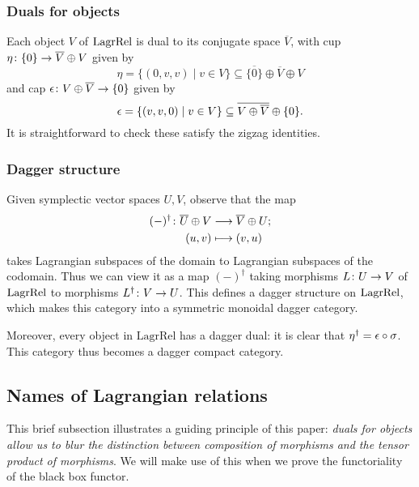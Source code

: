 \subsubsection*{Duals for objects}

Each object $V$ of $\mathrm{LagrRel}$ is dual to its conjugate space $\overline
V$, with cup $\eta{\colon} \{0\} \to \overline{V} \oplus V$ given by 
\[
  \eta = \{(0,v,v) \mid v \in V\} \subseteq \overline{\{0\}} \oplus \overline{V}
  \oplus V
\]
and cap $\epsilon{\colon} V \oplus \overline{V} \to \{0\}$ given by
\[
  \epsilon = \{(v,v,0) \mid v \in V\} \subseteq \overline{V \oplus \overline{V}}
  \oplus \{0\}.
\]
It is straightforward to check these satisfy the zigzag identities.

\subsubsection*{Dagger structure}

Given symplectic vector spaces $U,V$, observe that the map
\begin{align*}
  (-)^\dagger{\colon} \overline{U} \oplus V &\longrightarrow \overline{V} \oplus U; \\
  (u,v) &\longmapsto (v,u)
\end{align*} 
takes Lagrangian subspaces of the domain to Lagrangian subspaces of the
codomain. Thus we can view it as a map $(-)^\dagger$ taking morphisms $L{\colon} U \to V$
of $\mathrm{LagrRel}$ to morphisms $L^\dagger{\colon} V \to U$. This defines a
dagger structure on $\mathrm{LagrRel}$, which makes this category into a
symmetric monoidal dagger category.

Moreover, every object in $\mathrm{LagrRel}$ has a dagger dual: it is clear that
$\eta^\dagger = \epsilon \circ \sigma$.   This category thus becomes a dagger compact
category.

\subsection{Names of Lagrangian relations} \label{subsec:names}

This brief subsection illustrates a guiding principle of this paper: \emph{duals for
objects allow us to blur the distinction between composition of morphisms and the tensor product of morphisms}. We will make use of this when we prove
the functoriality of the black box functor.

